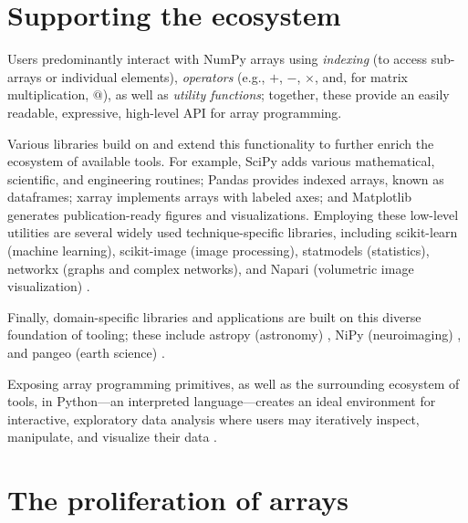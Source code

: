 \section*{Supporting the ecosystem}

Users predominantly interact with NumPy arrays using {\em indexing} (to access
sub-arrays or individual elements), {\em operators} (e.g., $+$, $-$, $\times$,
and, for matrix multiplication, $@$), as well as {\em utility functions};
together, these provide an easily readable, expressive, high-level API for
array programming.

Various libraries build on and extend this functionality to further enrich the ecosystem of available tools.  For example, SciPy adds various mathematical, scientific, and engineering routines; Pandas provides indexed arrays, known as dataframes; xarray implements arrays with labeled axes; and Matplotlib generates publication-ready figures and visualizations.  Employing these low-level utilities are several widely used technique-specific libraries, including scikit-learn (machine learning), scikit-image (image processing), statmodels (statistics),  networkx (graphs and complex networks), and Napari (volumetric image visualization) .  

Finally, domain-specific libraries and applications are built on this diverse foundation of tooling; these include astropy (astronomy) , NiPy (neuroimaging) , and pangeo (earth science) .



Exposing array programming primitives, as well as the surrounding ecosystem of tools, in Python---an interpreted language---creates an ideal environment for interactive, exploratory data analysis where users may iteratively inspect, manipulate, and visualize their data \cite{perez2007ipython}.

\section*{The proliferation of arrays}



